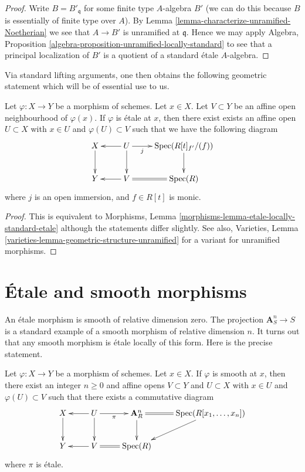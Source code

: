 \begin{proof}
Write $B = B'_{\mathfrak q}$ for some finite type $A$-algebra $B'$
(we can do this because $B$ is essentially of finite type over $A$).
By Lemma \ref{lemma-characterize-unramified-Noetherian}
we see that $A \to B'$ is unramified at $\mathfrak q$.
Hence we may apply
Algebra, Proposition \ref{algebra-proposition-unramified-locally-standard}
to see that a principal localization of $B'$ is a quotient of a
standard \'etale $A$-algebra.
\end{proof}

\noindent
Via standard lifting arguments, one then obtains the following geometric
statement which will be of essential use to us.

\begin{theorem}
\label{theorem-geometric-structure}
Let $\varphi : X \to Y$ be a morphism of schemes. Let $x \in X$.
Let $V \subset Y$ be an affine open neighbourhood of $\varphi(x)$.
If $\varphi$ is \'etale at $x$, then there exist exists an affine open
$U \subset X$ with $x \in U$ and $\varphi(U) \subset V$
such that we have the following diagram
$$
\xymatrix{
X \ar[d] & U \ar[l] \ar[d] \ar[r]_-j & \Spec(R[t]_{f'}/(f)) \ar[d] \\
Y & V \ar[l] \ar@{=}[r] & \Spec(R)
}
$$
where $j$ is an open immersion, and $f \in R[t]$ is monic.
\end{theorem}

\begin{proof}
This is equivalent to
Morphisms, Lemma \ref{morphisms-lemma-etale-locally-standard-etale}
although the statements differ slightly.
See also, Varieties, Lemma \ref{varieties-lemma-geometric-structure-unramified}
for a variant for unramified morphisms.
\end{proof}


\section{\'Etale and smooth morphisms}
\label{section-etale-smooth}

\noindent
An \'etale morphism is smooth of relative dimension zero.
The projection $\mathbf{A}^n_S \to S$ is a standard example
of a smooth morphism of relative dimension $n$.
It turns out that any smooth morphism is \'etale locally
of this form. Here is the precise statement.

\begin{theorem}
\label{theorem-smooth-etale-over-n-space}
Let $\varphi : X \to Y$ be a morphism of schemes.
Let $x \in X$.
If $\varphi$ is smooth at $x$, then
there exist an integer $n \geq 0$ and affine opens
$V \subset Y$ and $U \subset X$ with $x \in U$ and $\varphi(U) \subset V$
such that there exists a commutative diagram
$$
\xymatrix{
X \ar[d] & U \ar[l] \ar[d] \ar[r]_-\pi &
\mathbf{A}^n_R \ar[d] \ar@{=}[r] &  \Spec(R[x_1, \ldots, x_n]) \ar[dl] \\
Y & V \ar[l] \ar@{=}[r] & \Spec(R)
}
$$
where $\pi$ is \'etale.
\end{theorem}

